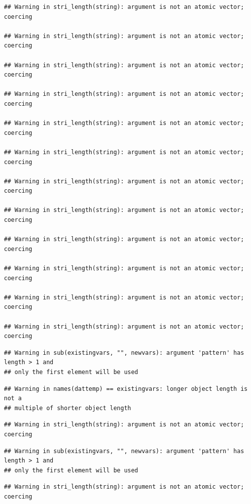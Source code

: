 \documentclass[
]{article}
\begin{document}
\begin{verbatim}
## Warning in stri_length(string): argument is not an atomic vector; coercing

## Warning in stri_length(string): argument is not an atomic vector; coercing

## Warning in stri_length(string): argument is not an atomic vector; coercing

## Warning in stri_length(string): argument is not an atomic vector; coercing

## Warning in stri_length(string): argument is not an atomic vector; coercing

## Warning in stri_length(string): argument is not an atomic vector; coercing

## Warning in stri_length(string): argument is not an atomic vector; coercing

## Warning in stri_length(string): argument is not an atomic vector; coercing

## Warning in stri_length(string): argument is not an atomic vector; coercing

## Warning in stri_length(string): argument is not an atomic vector; coercing

## Warning in stri_length(string): argument is not an atomic vector; coercing

## Warning in stri_length(string): argument is not an atomic vector; coercing
\end{verbatim}

\begin{verbatim}
## Warning in sub(existingvars, "", newvars): argument 'pattern' has length > 1 and
## only the first element will be used
\end{verbatim}

\begin{verbatim}
## Warning in names(dattemp) == existingvars: longer object length is not a
## multiple of shorter object length
\end{verbatim}

\begin{verbatim}
## Warning in stri_length(string): argument is not an atomic vector; coercing
\end{verbatim}

\begin{verbatim}
## Warning in sub(existingvars, "", newvars): argument 'pattern' has length > 1 and
## only the first element will be used
\end{verbatim}

\begin{verbatim}
## Warning in stri_length(string): argument is not an atomic vector; coercing
\end{verbatim}
\end{document}

